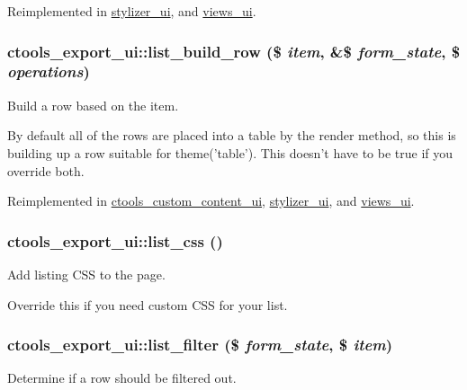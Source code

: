 Reimplemented in \hyperlink{classstylizer__ui_a124bf689e31b67033705f1b5a4bbf40b}{stylizer\_\-ui}, and \hyperlink{classviews__ui_aaa0602d4d7f77dc16eb57cc910aa87ac}{views\_\-ui}.\hypertarget{classctools__export__ui_ad72f3d7170f48e0d0cb1dacb2926bb78}{
\subsubsection[{list\_\-build\_\-row}]{\setlength{\rightskip}{0pt plus 5cm}ctools\_\-export\_\-ui::list\_\-build\_\-row (\$ {\em item}, \/  \&\$ {\em form\_\-state}, \/  \$ {\em operations})}}
\label{classctools__export__ui_ad72f3d7170f48e0d0cb1dacb2926bb78}
Build a row based on the item.

By default all of the rows are placed into a table by the render method, so this is building up a row suitable for theme('table'). This doesn't have to be true if you override both. 

Reimplemented in \hyperlink{classctools__custom__content__ui_a56ee3ac6704a7d3736da6d9cc6b229d4}{ctools\_\-custom\_\-content\_\-ui}, \hyperlink{classstylizer__ui_a37d2a02c59128507bb6e811b97de3f06}{stylizer\_\-ui}, and \hyperlink{classviews__ui_a195a6a1e5b21641032447fb474291e68}{views\_\-ui}.\hypertarget{classctools__export__ui_ae6d91d7aac792252de261ad9efea94c9}{
\subsubsection[{list\_\-css}]{\setlength{\rightskip}{0pt plus 5cm}ctools\_\-export\_\-ui::list\_\-css ()}}
\label{classctools__export__ui_ae6d91d7aac792252de261ad9efea94c9}
Add listing CSS to the page.

Override this if you need custom CSS for your list. \hypertarget{classctools__export__ui_aed7f3b1a8d7564168f89e2b450c6aa4a}{
\subsubsection[{list\_\-filter}]{\setlength{\rightskip}{0pt plus 5cm}ctools\_\-export\_\-ui::list\_\-filter (\$ {\em form\_\-state}, \/  \$ {\em item})}}
\label{classctools__export__ui_aed7f3b1a8d7564168f89e2b450c6aa4a}
Determine if a row should be filtered out.


